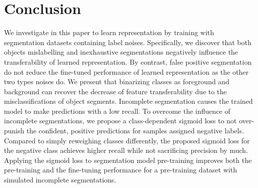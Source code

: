 \section{Conclusion}
\label{sec:conclusion}

We investigate in this paper to learn representation by training with segmentation datasets containing label noises.
Specifically, we discover that both objects mislabelling and inexhaustive segmentations negatively influence the transferability of learned representation.
By contrast, false positive segmentation do not reduce the fine-tuned performance of learned representation as the other two types noises do.
We present that binarizing classes as foreground and background can recover the decrease of feature transferability due to the misclassifications of object segments.
Incomplete segmentation causes the trained model to make predictions with a low recall.
To overcome the influence of incomplete segmentations, we propose a class-dependent sigmoid loss to not over-punish the confident, positive predictions for samples assigned negative labels.
Compared to simply reweighing classes differently, the proposed sigmoid loss for the negative class achieves higher recall while not sacrificing precision by much.
Applying the sigmoid loss to segmentation model pre-training improves both the pre-training and the fine-tuning performance for a pre-training dataset with simulated incomplete segmentations.
